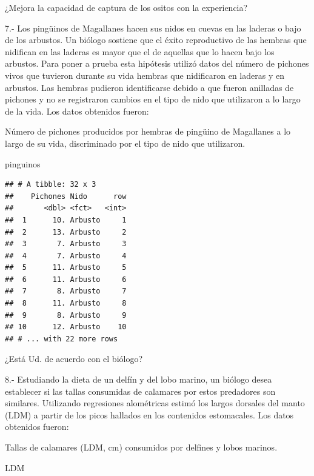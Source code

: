 \documentclass[]{book}
\newenvironment{Shaded}{\begin{snugshade}}{\end{snugshade}}
\newcommand{\NormalTok}[1]{#1}
\theoremstyle{definition}
\theoremstyle{definition}
\theoremstyle{definition}
\theoremstyle{remark}
\begin{document}
¿Mejora la capacidad de captura de los ositos con la experiencia?

7.- Los pingüinos de Magallanes hacen sus nidos en cuevas en las laderas
o bajo de los arbustos. Un biólogo sostiene que el éxito reproductivo de
las hembras que nidifican en las laderas es mayor que el de aquellas que
lo hacen bajo los arbustos. Para poner a prueba esta hipótesis utilizó
datos del número de pichones vivos que tuvieron durante su vida hembras
que nidificaron en laderas y en arbustos. Las hembras pudieron
identificarse debido a que fueron anilladas de pichones y no se
registraron cambios en el tipo de nido que utilizaron a lo largo de la
vida. Los datos obtenidos fueron:

Número de pichones producidos por hembras de pingüino de Magallanes a lo
largo de su vida, discriminado por el tipo de nido que utilizaron.

\begin{Shaded}
\begin{Highlighting}[]
\NormalTok{pinguinos}
\end{Highlighting}
\end{Shaded}

\begin{verbatim}
## # A tibble: 32 x 3
##    Pichones Nido      row
##       <dbl> <fct>   <int>
##  1      10. Arbusto     1
##  2      13. Arbusto     2
##  3       7. Arbusto     3
##  4       7. Arbusto     4
##  5      11. Arbusto     5
##  6      11. Arbusto     6
##  7       8. Arbusto     7
##  8      11. Arbusto     8
##  9       8. Arbusto     9
## 10      12. Arbusto    10
## # ... with 22 more rows
\end{verbatim}

¿Está Ud. de acuerdo con el biólogo?

8.- Estudiando la dieta de un delfín y del lobo marino, un biólogo desea
establecer si las tallas consumidas de calamares por estos predadores
son similares. Utilizando regresiones alométricas estimó los largos
dorsales del manto (LDM) a partir de los picos hallados en los
contenidos estomacales. Los datos obtenidos fueron:

Tallas de calamares (LDM, cm) consumidos por delfines y lobos marinos.

\begin{Shaded}
\begin{Highlighting}[]
\NormalTok{LDM }
\end{Highlighting}
\end{Shaded}
\end{document}
